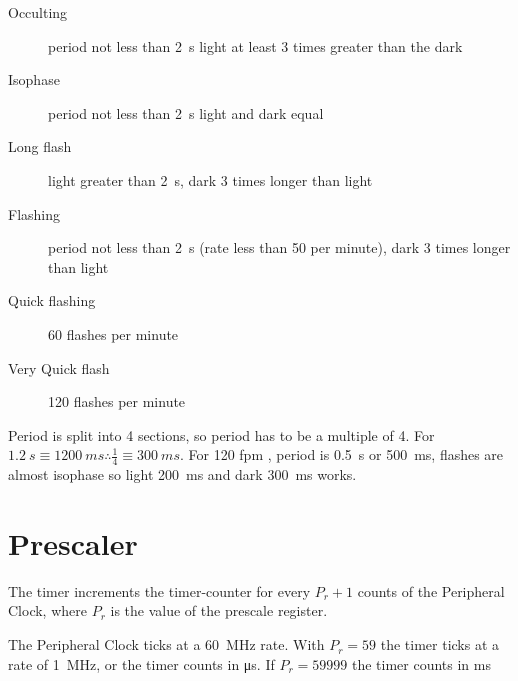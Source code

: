 \documentclass[12pt]{tufte-handout}
\begin{document}


\begin{description}
\item[Occulting] period not less than \SI{2}{s} light at least 3 times
  greater than the dark
\item[Isophase]  period not less than \SI{2}{s} light and dark equal
\item[Long flash] light greater than \SI{2}{s}, dark 3 times longer
  than light
\item[Flashing] period not less than \SI{2}{s} (rate less than 50 per minute), dark 3 times longer
  than light
\item[Quick flashing] 60 flashes per minute
\item[Very Quick flash] 120 flashes per minute
\end{description}

Period is split into 4 sections, so period has to be a multiple of 4.
For $\SI{1.2}{s} \equiv \SI{1200}{ms} \therefore \frac{1}{4} \equiv
\SI{300}{ms}$.
For 120 fpm , period is \SI{0.5}{s} or \SI{500}{ms}, flashes are
almost isophase so light \SI{200}{ms} and dark \SI{300}{ms} works.

\section{Prescaler}
The timer increments the timer-counter for every $P_r+1$ counts of the
Peripheral Clock, where $P_r$ is the value of the prescale register.

The Peripheral Clock ticks at a \SI{60}{\mega\hertz} rate.  With
$P_r=59$ the timer ticks at a rate of \SI{1}{\mega\hertz}, or the
timer counts in \si{\micro\second}.  If $P_r=\num{59999}$ the timer
counts in \si{\milli\second}




\end{document}
